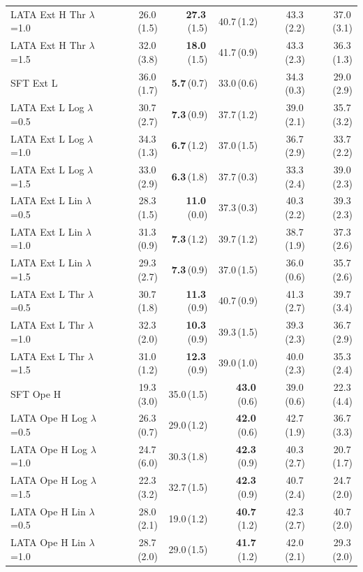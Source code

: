 \begin{longtable}{lrrrrr}
LATA Ext H Thr $\lambda$=1.0 & 26.0\,(1.5) & \textbf{27.3}\,(1.5) & 40.7\,(1.2) & 43.3\,(2.2) & 37.0\,(3.1) \\
LATA Ext H Thr $\lambda$=1.5 & 32.0\,(3.8) & \textbf{18.0}\,(1.5) & 41.7\,(0.9) & 43.3\,(2.3) & 36.3\,(1.3) \\
SFT Ext L & 36.0\,(1.7) & \textbf{5.7}\,(0.7) & 33.0\,(0.6) & 34.3\,(0.3) & 29.0\,(2.9) \\
LATA Ext L Log $\lambda$=0.5 & 30.7\,(2.7) & \textbf{7.3}\,(0.9) & 37.7\,(1.2) & 39.0\,(2.1) & 35.7\,(3.2) \\
LATA Ext L Log $\lambda$=1.0 & 34.3\,(1.3) & \textbf{6.7}\,(1.2) & 37.0\,(1.5) & 36.7\,(2.9) & 33.7\,(2.2) \\
LATA Ext L Log $\lambda$=1.5 & 33.0\,(2.9) & \textbf{6.3}\,(1.8) & 37.7\,(0.3) & 33.3\,(2.4) & 39.0\,(2.3) \\
LATA Ext L Lin $\lambda$=0.5 & 28.3\,(1.5) & \textbf{11.0}\,(0.0) & 37.3\,(0.3) & 40.3\,(2.2) & 39.3\,(2.3) \\
LATA Ext L Lin $\lambda$=1.0 & 31.3\,(0.9) & \textbf{7.3}\,(1.2) & 39.7\,(1.2) & 38.7\,(1.9) & 37.3\,(2.6) \\
LATA Ext L Lin $\lambda$=1.5 & 29.3\,(2.7) & \textbf{7.3}\,(0.9) & 37.0\,(1.5) & 36.0\,(0.6) & 35.7\,(2.6) \\
LATA Ext L Thr $\lambda$=0.5 & 30.7\,(1.8) & \textbf{11.3}\,(0.9) & 40.7\,(0.9) & 41.3\,(2.7) & 39.7\,(3.4) \\
LATA Ext L Thr $\lambda$=1.0 & 32.3\,(2.0) & \textbf{10.3}\,(0.9) & 39.3\,(1.5) & 39.3\,(2.3) & 36.7\,(2.9) \\
LATA Ext L Thr $\lambda$=1.5 & 31.0\,(1.2) & \textbf{12.3}\,(0.9) & 39.0\,(1.0) & 40.0\,(2.3) & 35.3\,(2.4) \\
SFT Ope H & 19.3\,(3.0) & 35.0\,(1.5) & \textbf{43.0}\,(0.6) & 39.0\,(0.6) & 22.3\,(4.4) \\
LATA Ope H Log $\lambda$=0.5 & 26.3\,(0.7) & 29.0\,(1.2) & \textbf{42.0}\,(0.6) & 42.7\,(1.9) & 36.7\,(3.3) \\
LATA Ope H Log $\lambda$=1.0 & 24.7\,(6.0) & 30.3\,(1.8) & \textbf{42.3}\,(0.9) & 40.3\,(2.7) & 20.7\,(1.7) \\
LATA Ope H Log $\lambda$=1.5 & 22.3\,(3.2) & 32.7\,(1.5) & \textbf{42.3}\,(0.9) & 40.7\,(2.4) & 24.7\,(2.0) \\
LATA Ope H Lin $\lambda$=0.5 & 28.0\,(2.1) & 19.0\,(1.2) & \textbf{40.7}\,(1.2) & 42.3\,(2.7) & 40.7\,(2.0) \\
LATA Ope H Lin $\lambda$=1.0 & 28.7\,(2.0) & 29.0\,(1.5) & \textbf{41.7}\,(1.2) & 42.0\,(2.1) & 29.3\,(2.0) \\

\end{longtable}
